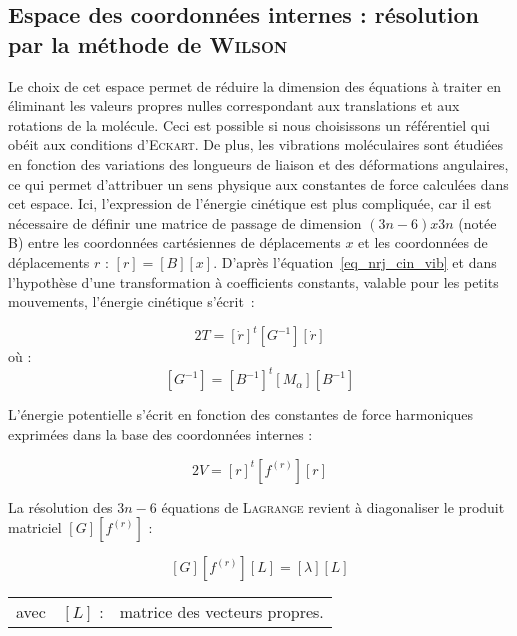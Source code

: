 \subsection{Espace des coordonnées internes : résolution par la méthode de \textsc{Wilson}}

Le choix de cet espace permet de réduire la dimension des équations à traiter en éliminant les valeurs propres nulles correspondant aux translations et aux rotations de la molécule. Ceci est possible si nous choisissons un référentiel qui obéit aux conditions d'\textsc{Eckart}. De plus, les vibrations moléculaires sont étudiées en fonction des variations des longueurs de liaison et des déformations angulaires, ce qui permet d'attribuer un sens physique aux constantes de force calculées dans cet espace.
Ici, l'expression de l'énergie cinétique est plus compliquée, car il est nécessaire de définir une matrice de passage de dimension $(3n-6)x3n$ (notée B) entre les coordonnées cartésiennes de déplacements $x$ et les coordonnées de déplacements $r$ : $\left[r\right] = \left[B\right]\left[x\right]$. D'après l'équation~\ref{eq_nrj_cin_vib} et dans l'hypothèse d'une transformation à coefficients constants, valable pour les petits mouvements, l'énergie cinétique s'écrit~:

\begin{equation}
	2T = \left[\dot{r}\right]^t\left[G^{-1}\right]\left[\dot{r}\right] 
\end{equation}
\noindent où :
\begin{equation}
\left[G^{-1}\right] = \left[B^{-1}\right]^t \left[M_{\alpha}\right]\left[B^{-1}\right]
\end{equation}

L'énergie potentielle s'écrit en fonction des constantes de force harmoniques exprimées dans la base des coordonnées internes :

\begin{equation}
	2V = \left[r\right]^t \left[f^{(r)}\right] \left[r\right]
\end{equation}

La résolution des $3n-6$ équations de \textsc{Lagrange} revient à diagonaliser le produit matriciel $\left[G\right]\left[f^{(r)}\right]$ :

\begin{equation}
	\left[G\right]\left[f^{(r)}\right]\left[L\right] = \left[\lambda\right]\left[L\right]
\end{equation}
\begin{flushleft}
\begin{tabular}{@{}lrp{10cm}}
avec & $\left[L\right]$ : & matrice des vecteurs propres. 
\end{tabular}
\end{flushleft}


